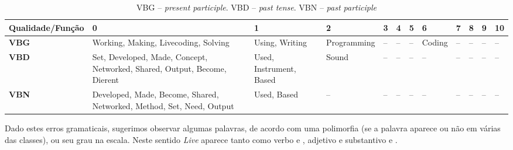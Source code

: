 \begin{table}
\centering
\caption{VBG -- \emph{present participle}. VBD -- \emph{past tense}. VBN -- \emph{past participle}}
\label{tab:gen2}
\small
\begin{tabular}{ | p{2.6cm} | p{2.6cm} | p{1.75cm} | p{1.75cm} | p{0.25cm} | p{0.25cm} | p{0.25cm} | p{1cm} | p{0.25cm} | p{0.25cm} | p{0.25cm} | p{0.25cm} |}
\hline
\hline
\tiny \textbf{Qualidade/Função}
 & \textbf{0}
 & \textbf{1}
 & \textbf{2}
 & \textbf{3}
 & \textbf{4}
 & \textbf{5}
 & \textbf{6}
 & \textbf{7}
 & \textbf{8}
 & \textbf{9}
 & \textbf{10} \\ 
\hline
\hline
\tiny \textbf{VBG}
 & \tiny Working, Making, Livecoding, Solving  & \tiny Using, Writing  & \tiny Programming  & \tiny --  & \tiny --  & \tiny --  & \tiny Coding  & \tiny --  & \tiny --  & \tiny --  & \tiny -- \\
\hline
\tiny \textbf{VBD}
 & \tiny Set, Developed, Made, Concept, Networked, Shared, Output, Become, Dierent  & \tiny Used, Instrument, Based  & \tiny Sound  & \tiny --  & \tiny --  & \tiny --  & \tiny --  & \tiny --  & \tiny --  & \tiny --  & \tiny -- \\
\hline
\tiny \textbf{VBN}
 & \tiny Developed, Made, Become, Shared, Networked, Method, Set, Need, Output  & \tiny Used, Based  & \tiny --  & \tiny --  & \tiny --  & \tiny --  & \tiny --  & \tiny --  & \tiny --  & \tiny --  & \tiny -- \\
 \hline
  \hline
\end{tabular}
\end{table}

Dado estes erros gramaticais, sugerimos observar algumas palavras, de acordo com uma polimorfia (se a palavra aparece ou não em várias das classes), ou seu grau na escala. Neste sentido \emph{Live} aparece tanto como verbo  e , adjetivo  e substantivo  e . 

